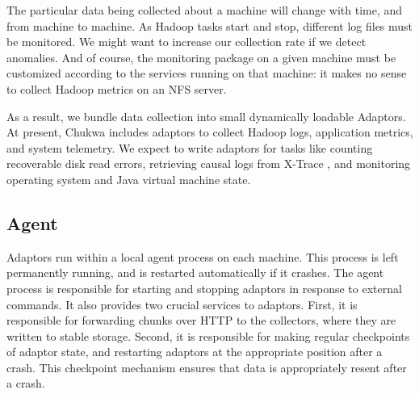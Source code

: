 \documentclass[letterpaper,twocolumn,10pt]{article}
\begin{document}
The particular data being collected about a machine will change with time, and from machine to machine. As Hadoop tasks start and stop, different log files must be monitored. We might want to increase our collection rate if we detect anomalies.  And of course, the monitoring package on a given machine must be customized according to the services running on that machine: it makes no sense to collect Hadoop metrics on an NFS server.

As a result, we bundle data collection into small dynamically loadable Adaptors.  At present, Chukwa includes adaptors to collect Hadoop logs, application metrics, and system telemetry. We expect to write adaptors for tasks like counting recoverable disk read errors, retrieving causal logs from X-Trace \cite{xtrace}, and monitoring operating system and Java virtual machine state. 




\subsection{Agent}

Adaptors run within a local agent process on each machine. This process is left permanently running, and is restarted automatically if it crashes. The agent process is responsible for starting and stopping adaptors in response to external commands.  It also provides two crucial services to adaptors. First, it is responsible for forwarding chunks over HTTP to the collectors, where they are written to stable storage. Second, it is responsible for making regular checkpoints of adaptor state, and restarting adaptors at the appropriate position after a crash.  This checkpoint mechanism ensures that data is appropriately resent after a crash.
\end{document}
